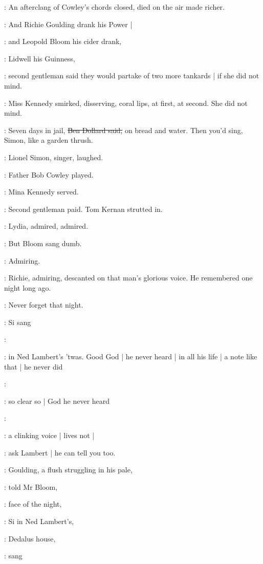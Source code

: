:
An afterclang of Cowley's chords closed,
died on the air
made richer.

:
And Richie Goulding drank his Power |

:
and Leopold Bloom his cider drank,

:
Lidwell his Guinness,

:
second gentleman said they would partake of two more tankards |
if she did not mind.

:
Miss Kennedy smirked,
disserving,
coral lips,
at first,
at second.
She did not mind.

\dollard:
Seven days in jail,
\sout{Ben Dollard said,}
on bread and water.
Then you'd sing,
Simon,
like a garden thrush.

:
Lionel Simon,
singer,
laughed.

:
Father Bob Cowley played.

:
Mina Kennedy served.

:
Second gentleman paid.
Tom Kernan strutted in.

:
Lydia,
admired,
admired.

:
But Bloom sang dumb.

:
Admiring.

:
Richie,
admiring,
descanted on that man's glorious voice.
He remembered one night long ago.

\goulding:
Never forget that night.

:
Si sang

\simon:

:
in Ned Lambert's 'twas.
Good God |
he never heard |
in all his life |
a note like that |
he never did

\simon:

:
so clear so |
God he never heard

\simon:

:
a clinking voice |
lives not |

\goulding:
ask Lambert |
he can tell you too.

:
Goulding,
a flush struggling in his pale,

:
told Mr Bloom,

:
face of the night,

\goulding:
Si in Ned Lambert's,

:
Dedalus house,

\goulding:
sang

